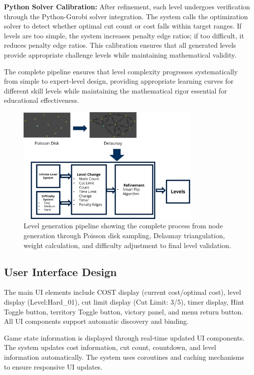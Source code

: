 \documentclass[english]{tudscrreprt}
\begin{document}
\textbf{Python Solver Calibration:} After refinement, each level undergoes verification through the Python-Gurobi solver integration. The system calls the optimization solver to detect whether optimal cut count or cost falls within target ranges. If levels are too simple, the system increases penalty edge ratios; if too difficult, it reduces penalty edge ratios. This calibration ensures that all generated levels provide appropriate challenge levels while maintaining mathematical validity.

The complete pipeline ensures that level complexity progresses systematically from simple to expert-level design, providing appropriate learning curves for different skill levels while maintaining the mathematical rigor essential for educational effectiveness.

\begin{figure}[h]
\centering
\includegraphics[width=0.8\textwidth]{figures/level_generation.png}
\caption{Level generation pipeline showing the complete process from node generation through Poisson disk sampling, Delaunay triangulation, weight calculation, and difficulty adjustment to final level validation.}
\label{fig:level_generation}
\end{figure}

\subsection{User Interface Design}
The main UI elements include COST display (current cost/optimal cost), level display (Level:Hard\_01), cut limit display (Cut Limit: 3/5), timer display, Hint Toggle button, territory Toggle button, victory panel, and menu return button. All UI components support automatic discovery and binding.

Game state information is displayed through real-time updated UI components. The system updates cost information, cut count, countdown, and level information automatically. The system uses coroutines and caching mechanisms to ensure responsive UI updates.
\end{document}
